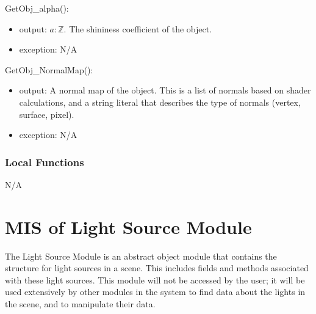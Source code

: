 \documentclass[12pt, titlepage]{article}
\begin{document}
\noindent GetObj\_alpha():
\begin{itemize}
	\item output: $a : \mathbb{Z}$. The shininess coefficient of the object.
	\item exception: N/A
\end{itemize}

\noindent GetObj\_NormalMap():
\begin{itemize}
	\item output: A normal map of the object. This is a list of normals based 
	on shader calculations, and a string literal that describes the type of 
	normals (vertex, surface, pixel).
	\item exception: N/A
\end{itemize}

%

\subsubsection{Local Functions}
N/A

\newpage

\section{MIS of Light Source Module} \label{mLights} 
The Light Source Module is an abstract object module that contains the 
structure for light sources in a scene. This includes fields and methods 
associated with these light sources. This module will not be accessed by the 
user; it will be used extensively by other modules in the system to find data 
about the lights in the scene, and to manipulate their data.
%
%
\end{document}
